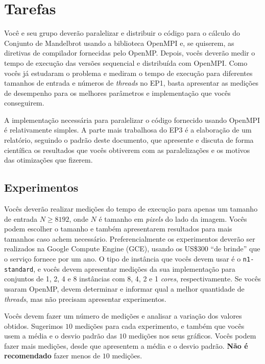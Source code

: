\documentclass[final,12pt,a4paper]{elsarticle}
\begin{document}
\section{Tarefas}

Você e seu grupo deverão paralelizar e distribuir o código para o cálculo do
Conjunto de Mandelbrot usando a biblioteca OpenMPI e, se quiserem, as diretivas
de compilador fornecidas pelo OpenMP. Depois, vocês deverão medir o tempo de
execução das versões sequencial e distribuída com OpenMPI.  Como vocês já
estudaram o problema e mediram o tempo de execução para diferentes tamanhos de
entrada e números de \textit{threads} no EP1, basta apresentar as medições de
desempenho para os melhores parâmetros e implementação que vocês conseguirem.

A implementação necessária para paralelizar o código fornecido usando OpenMPI é
relativamente simples. A parte mais trabalhosa do EP3 é a elaboração de um
relatório, seguindo o padrão deste documento, que apresente e discuta de forma
científica os resultados que vocês obtiverem com as paralelizações e os motivos
das otimizações que fizerem.

\subsection{Experimentos}

Vocês deverão realizar medições do tempo de execução para apenas um tamanho de
entrada $N \geq 8192$, onde $N$ é tamanho em \textit{pixels} do lado da imagem.
Vocês podem escolher o tamanho e também apresentarem resultados para mais
tamanhos caso achem necessário.
Preferencialmente os experimentos deverão ser realizados na Google Compute
Engine (GCE), usando os US\$300 ``de brinde'' que o serviço fornece por um ano.
O tipo de instância que vocês devem usar é o \texttt{n1-standard}, e vocês
devem apresentar medições da sua implementação para conjuntos de 1, 2, 4 e 8
instâncias com 8, 4, 2 e 1 \textit{cores}, respectivamente.
Se vocês usaram OpenMP, devem determinar e informar qual a melhor quantidade de
\textit{threads}, mas não precisam apresentar experimentos.

Vocês devem fazer um número de medições e analisar a variação dos valores
obtidos.  Sugerimos $10$ medições para cada experimento, e também que vocês
usem a média e o desvio padrão das $10$ medições nos seus gráficos. Vocês podem
fazer mais medições, desde que apresentem a média e o desvio padrão.
\textbf{Não é recomendado} fazer menos de $10$ medições.
\end{document}
